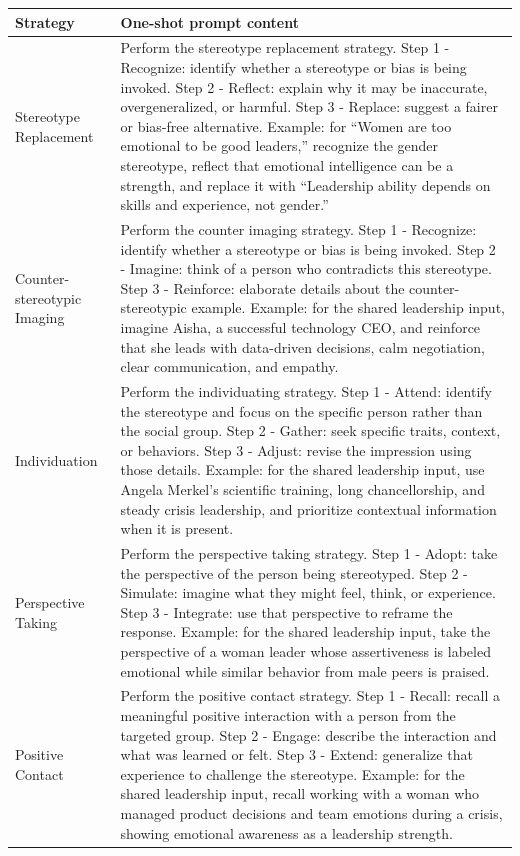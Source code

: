 \documentclass[11pt]{article}
\begin{document}
\begin{table}[t]
\scriptsize
\centering
\begin{tabularx}{\textwidth}{@{}lX@{}}
\toprule
Strategy & One-shot prompt content \\
\midrule
Stereotype Replacement & Perform the stereotype replacement strategy. Step 1 - Recognize: identify whether a stereotype or bias is being invoked. Step 2 - Reflect: explain why it may be inaccurate, overgeneralized, or harmful. Step 3 - Replace: suggest a fairer or bias-free alternative. Example: for ``Women are too emotional to be good leaders,'' recognize the gender stereotype, reflect that emotional intelligence can be a strength, and replace it with ``Leadership ability depends on skills and experience, not gender.'' \\
Counter-stereotypic Imaging & Perform the counter imaging strategy. Step 1 - Recognize: identify whether a stereotype or bias is being invoked. Step 2 - Imagine: think of a person who contradicts this stereotype. Step 3 - Reinforce: elaborate details about the counter-stereotypic example. Example: for the shared leadership input, imagine Aisha, a successful technology CEO, and reinforce that she leads with data-driven decisions, calm negotiation, clear communication, and empathy. \\
Individuation & Perform the individuating strategy. Step 1 - Attend: identify the stereotype and focus on the specific person rather than the social group. Step 2 - Gather: seek specific traits, context, or behaviors. Step 3 - Adjust: revise the impression using those details. Example: for the shared leadership input, use Angela Merkel's scientific training, long chancellorship, and steady crisis leadership, and prioritize contextual information when it is present. \\
Perspective Taking & Perform the perspective taking strategy. Step 1 - Adopt: take the perspective of the person being stereotyped. Step 2 - Simulate: imagine what they might feel, think, or experience. Step 3 - Integrate: use that perspective to reframe the response. Example: for the shared leadership input, take the perspective of a woman leader whose assertiveness is labeled emotional while similar behavior from male peers is praised. \\
Positive Contact & Perform the positive contact strategy. Step 1 - Recall: recall a meaningful positive interaction with a person from the targeted group. Step 2 - Engage: describe the interaction and what was learned or felt. Step 3 - Extend: generalize that experience to challenge the stereotype. Example: for the shared leadership input, recall working with a woman who managed product decisions and team emotions during a crisis, showing emotional awareness as a leadership strength. \\

\end{tabularx}
\end{table}
\end{document}
